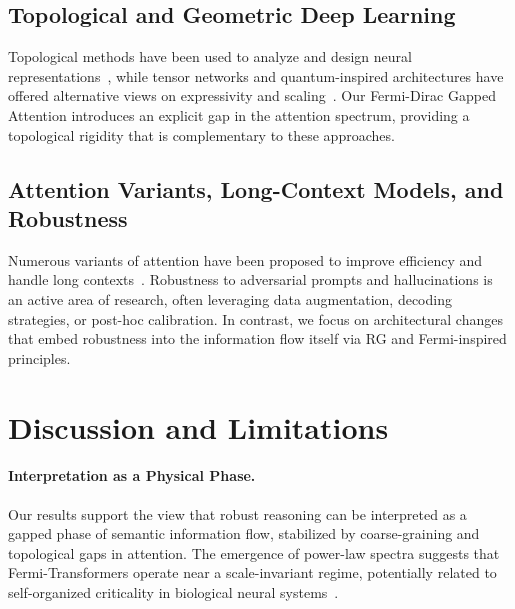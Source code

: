 \documentclass{article}
\begin{document}
\subsection{Topological and Geometric Deep Learning}

Topological methods have been used to analyze and design neural representations~\cite{carlsson2009topology,bronstein2017geometric,battiloro2024topological,fujimoto2024topological}, while tensor networks and quantum-inspired architectures have offered alternative views on expressivity and scaling~\cite{carleo2017solving,stoudenmire2016supervised,vidal2008class,han2018unsupervised,novikov2015tensor,ali2024tensor}. Our Fermi-Dirac Gapped Attention introduces an explicit gap in the attention spectrum, providing a topological rigidity that is complementary to these approaches.

\subsection{Attention Variants, Long-Context Models, and Robustness}

Numerous variants of attention have been proposed to improve efficiency and handle long contexts~\cite{beltagy2020longformer,katharopoulos2020transformers,dao2022flashattention,gu2023mamba}. Robustness to adversarial prompts and hallucinations is an active area of research, often leveraging data augmentation, decoding strategies, or post-hoc calibration. In contrast, we focus on architectural changes that embed robustness into the information flow itself via RG and Fermi-inspired principles.

\section{Discussion and Limitations}

\paragraph{Interpretation as a Physical Phase.}
Our results support the view that robust reasoning can be interpreted as a gapped phase of semantic information flow, stabilized by coarse-graining and topological gaps in attention. The emergence of power-law spectra suggests that Fermi-Transformers operate near a scale-invariant regime, potentially related to self-organized criticality in biological neural systems~\cite{chialvo2010emergent}.
\end{document}
